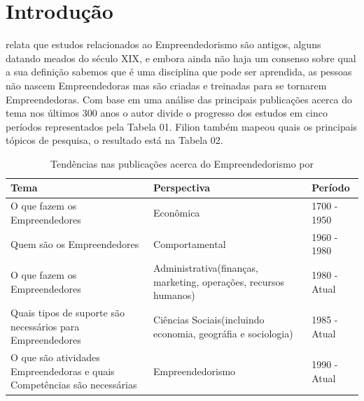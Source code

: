 \chapter{Introdução}
\label{cap-introducao}

 relata que estudos relacionados ao Empreendedorismo são antigos, alguns datando meados do século XIX, e embora ainda não haja um consenso sobre qual a sua definição sabemos que é uma disciplina que pode ser aprendida, as pessoas não nascem Empreendedoras mas são criadas e treinadas para se tornarem Empreendedoras. Com base em uma análise das principais publicações acerca do tema nos últimos 300 anos o autor divide o progresso dos estudos em cinco períodos representados pela Tabela 01. Filion também mapeou quais os principais tópicos de pesquisa, o resultado está na Tabela 02.

\begin{table}[!htb]
	\centering
	\label{tabela:tendencias_nas_publicacoes_acerca_do_empreendedorismo}
	\begin{tabular}{ | p{6cm} | p{6cm} | p{3cm} | }
		\hline
		Tema & Perspectiva & Período \\ \hline
		O que fazem os Empreendedores & Econômica & 1700 - 1950 \\ \hline
		Quem são os Empreendedores & Comportamental & 1960 - 1980 \\ \hline
		O que fazem os Empreendedores & Administrativa(finanças, marketing, operações, recursos humanos) & 1980 - Atual \\ \hline
		Quais tipos de suporte são necessários para Empreendedores & Ciências Sociais(incluindo economia, geográfia e sociologia) & 1985 - Atual \\ \hline
		O que são atividades Empreendedoras e quais Competências são necessárias & Empreendedorismo & 1990 - Atual \\ \hline
	\end{tabular}
	\caption{Tendências nas publicações acerca do Empreendedorismo por \cite{Filion1998}}
\end{table}

